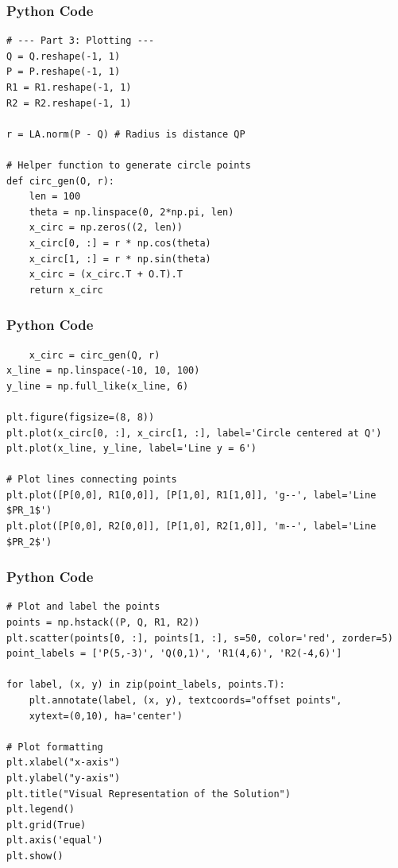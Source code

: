 \documentclass{beamer}
\begin{document}
\begin{frame}[fragile]
    \frametitle{Python Code}
    \begin{lstlisting}
# --- Part 3: Plotting ---
Q = Q.reshape(-1, 1)
P = P.reshape(-1, 1)
R1 = R1.reshape(-1, 1)
R2 = R2.reshape(-1, 1)

r = LA.norm(P - Q) # Radius is distance QP

# Helper function to generate circle points
def circ_gen(O, r):
    len = 100
    theta = np.linspace(0, 2*np.pi, len)
    x_circ = np.zeros((2, len))
    x_circ[0, :] = r * np.cos(theta)
    x_circ[1, :] = r * np.sin(theta)
    x_circ = (x_circ.T + O.T).T
    return x_circ
    \end{lstlisting}
\end{frame}

\begin{frame}[fragile]
    \frametitle{Python Code}
    \begin{lstlisting}
    x_circ = circ_gen(Q, r)
x_line = np.linspace(-10, 10, 100)
y_line = np.full_like(x_line, 6)

plt.figure(figsize=(8, 8))
plt.plot(x_circ[0, :], x_circ[1, :], label='Circle centered at Q')
plt.plot(x_line, y_line, label='Line y = 6')

# Plot lines connecting points
plt.plot([P[0,0], R1[0,0]], [P[1,0], R1[1,0]], 'g--', label='Line $PR_1$')
plt.plot([P[0,0], R2[0,0]], [P[1,0], R2[1,0]], 'm--', label='Line $PR_2$')
    \end{lstlisting}
\end{frame}

\begin{frame}[fragile]
    \frametitle{Python Code}
    \begin{lstlisting}
# Plot and label the points
points = np.hstack((P, Q, R1, R2))
plt.scatter(points[0, :], points[1, :], s=50, color='red', zorder=5)
point_labels = ['P(5,-3)', 'Q(0,1)', 'R1(4,6)', 'R2(-4,6)']

for label, (x, y) in zip(point_labels, points.T):
    plt.annotate(label, (x, y), textcoords="offset points", 
    xytext=(0,10), ha='center')

# Plot formatting
plt.xlabel("x-axis")
plt.ylabel("y-axis")
plt.title("Visual Representation of the Solution")
plt.legend()
plt.grid(True)
plt.axis('equal')
plt.show()
    \end{lstlisting}
\end{frame}
\end{document}
